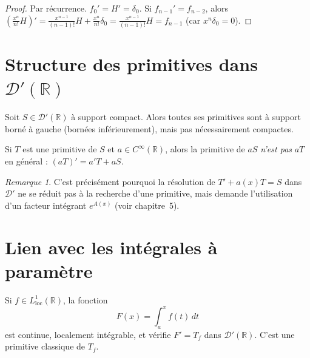 \documentclass[12pt,a4paper,openany]{book}
\theoremstyle{definition}
\theoremstyle{plain}
\theoremstyle{remark}
\newtheorem*{remark}{Remarque}
\newenvironment{remarque}{\begin{remark}}{\end{remark}}
\begin{document}
	\begin{proof}
		Par récurrence. $f_0' = H' = \delta_0$. Si $f_{n-1}' = f_{n-2}$, alors
		$\left(\frac{x^n}{n!}H\right)' = \frac{x^{n-1}}{(n-1)!}H + \frac{x^n}{n!}\delta_0 = \frac{x^{n-1}}{(n-1)!}H = f_{n-1}$
		(car $x^n\delta_0 = 0$).
	\end{proof}
	
	\section{Structure des primitives dans \texorpdfstring{$\mathcal{D}'(\mathbb{R})$}{D'(R)}}
	
	\begin{proposition}
		Soit $S \in \mathcal{D}'(\mathbb{R})$ à support compact. Alors toutes ses primitives sont à support borné à gauche (bornées inférieurement), mais pas nécessairement compactes.
	\end{proposition}
	
	\begin{proposition}
		Si $T$ est une primitive de $S$ et $a \in C^\infty(\mathbb{R})$, alors la primitive de $aS$ \emph{n'est pas} $aT$ en général : $(aT)' = a'T + aS$.
	\end{proposition}
	
	\begin{remarque}
		C'est précisément pourquoi la résolution de $T' + a(x)T = S$ dans $\mathcal{D}'$ ne se réduit pas à la recherche d'une primitive, mais demande l'utilisation d'un facteur intégrant $e^{A(x)}$ (voir chapitre~5).
	\end{remarque}
	
	\section{Lien avec les intégrales à paramètre}
	
	\begin{theorem}
		Si $f \in L^1_{\text{loc}}(\mathbb{R})$, la fonction
		\[
		F(x) = \int_a^x f(t)\,dt
		\]
		est continue, localement intégrable, et vérifie $F' = T_f$ dans $\mathcal{D}'(\mathbb{R})$. C'est une primitive classique de $T_f$.
	\end{theorem}
	
\end{document}
